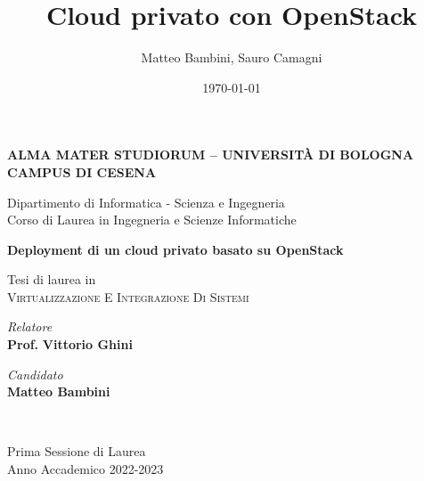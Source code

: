 \title{Cloud privato con OpenStack}
\author{Matteo Bambini, Sauro Camagni}
\date{\today}

\begin{titlepage}
    \begin{center}

        \large
        \textbf{ALMA MATER STUDIORUM -- UNIVERSITÀ DI BOLOGNA \\ CAMPUS DI CESENA}
        \\
        \noindent\hrulefill
        \vspace{0.4cm}

        \Large
        Dipartimento di Informatica - Scienza e Ingegneria \\
        Corso di Laurea in Ingegneria e Scienze Informatiche

        \Huge
        \vspace{4cm}
        \textbf{
            Deployment di un cloud privato basato su OpenStack
        }

        \large
        \vspace{1cm}
        Tesi di laurea in
        \\
        \textsc{Virtualizzazione E Integrazione Di Sistemi}

        \vfill
        \begin{minipage}[t]{0.64\textwidth}
            \begin{flushleft}
                \textit{Relatore}
                \\
                \textbf{Prof.} \textbf{Vittorio Ghini}
            \end{flushleft}
        \end{minipage}
        \begin{minipage}[t]{0.34\textwidth}
            \begin{flushright}
                \textit{Candidato}
                \\
                \textbf{Matteo Bambini}
            \end{flushright}
        \end{minipage}\\

        \vspace{1cm}
        \noindent\hrulefill
        \vspace{0.3cm}
        \Large

        Prima Sessione di Laurea
        \\
        Anno Accademico 2022-2023
    \end{center}
\end{titlepage}
\restoregeometry
